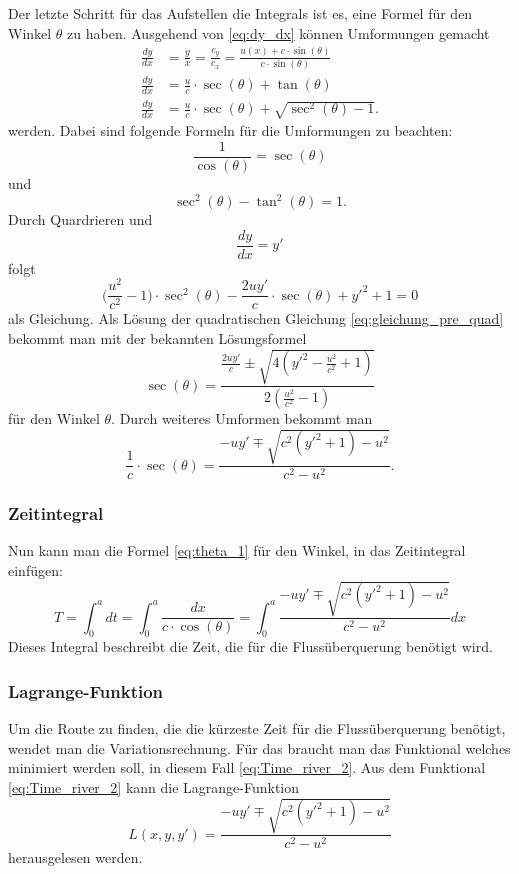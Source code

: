 Der letzte Schritt für das Aufstellen die Integrals ist es, eine Formel für den Winkel \(\theta\) zu haben.
Ausgehend von \eqref{eq:dy_dx} können Umformungen gemacht 
\begin{align}
    \frac{dy}{dx} &= \frac{\dot{y}}{\dot{x}} = \frac{c_y}{c_x} = \frac{u(x) + c \cdot \sin(\theta)}{c \cdot \sin(\theta)} \\
    \frac{dy}{dx} &= \frac{u}{c}\cdot \sec(\theta) + \tan(\theta) \\
    \frac{dy}{dx} &= \frac{u}{c}\cdot \sec(\theta) + \sqrt{\sec^2(\theta)-1}. 
\end{align}
werden. Dabei sind folgende Formeln für die Umformungen zu beachten: \[\frac{1}{\cos(\theta)} = \sec(\theta)\] und \[\sec^2(\theta)-\tan^2(\theta) = 1.\] Durch Quardrieren und \[\frac{dy}{dx} = y'\] folgt 
\begin{equation}
    \biggl(\frac{u^2}{c^2}-1 \biggr) \cdot \sec^2(\theta) - \frac{2uy'}{c}\cdot \sec(\theta) + y'^2 +1 = 0 \label{eq:gleichung_pre_quad}
\end{equation}
als Gleichung. Als Lösung der quadratischen Gleichung \eqref{eq:gleichung_pre_quad} bekommt man mit der bekannten Lösungsformel 
\begin{equation}
    \sec(\theta) = \frac{\frac{2uy'}{c} \pm \sqrt{4(y'^2-\frac{u^2}{c^2} + 1)}}{2(\frac{u^2}{c^2}-1)}
\end{equation}
für den Winkel \(\theta\). Durch weiteres Umformen bekommt man
\begin{equation}
    \frac{1}{c}\cdot \sec(\theta) = \frac{-uy' \mp \sqrt{c^2(y'^2+1)-u^2}}{c^2-u^2} .\label{eq:theta_1}
\end{equation}


\subsubsection{Zeitintegral}

Nun kann man die Formel \eqref{eq:theta_1} für den Winkel, in das Zeitintegral einfügen:
\begin{equation}
    T = \int_0^adt = \int_0^a\frac{dx}{c\cdot \cos(\theta)} = \int_0^a \frac{-uy' \mp \sqrt{c^2(y'^2+1)-u^2}}{c^2-u^2} dx
    \label{eq:Time_river_2} 
\end{equation}
Dieses Integral  beschreibt die Zeit, die für die Flussüberquerung benötigt wird. 



\subsubsection{Lagrange-Funktion} 
Um die Route zu finden, die die kürzeste Zeit für die Flussüberquerung benötigt, wendet man die Variationsrechnung. Für das braucht man das  Funktional welches minimiert werden soll, in diesem Fall \eqref{eq:Time_river_2}. 
Aus dem Funktional \eqref{eq:Time_river_2} kann die Lagrange-Funktion
\begin{equation}\label{eq:lagrange_integral}
    L(x, y, y') = \frac{-uy' \mp \sqrt{c^2(y'^2+1)-u^2}}{c^2-u^2}
\end{equation}
herausgelesen werden. 

